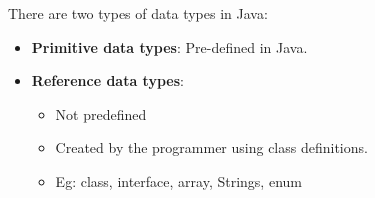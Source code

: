 \setlength{\columnsep}{5pt}

\begin{flushleft}
	
	There are two types of data types in Java:
	
	\begin{itemize}
		\item \textbf{Primitive data types}: Pre-defined in Java.
		\item \textbf{Reference data types}: 
		\begin{itemize}
			\item Not predefined
			\item Created by the programmer using class definitions. 
			\item Eg: class, interface, array, Strings, enum
		\end{itemize}
	\end{itemize}

\newpage
{}

	
\end{flushleft}

